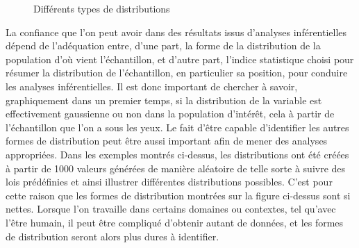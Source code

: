 \documentclass[
  letterpaper,
]{book}
\begin{document}
\begin{figure}


\caption{\label{fig-variousDistributions}Différents types de
distributions}

\end{figure}%

La confiance que l'on peut avoir dans des résultats issus d'analyses
inférentielles dépend de l'adéquation entre, d'une part, la forme de la
distribution de la population d'où vient l'échantillon, et d'autre part,
l'indice statistique choisi pour résumer la distribution de
l'échantillon, en particulier sa position, pour conduire les analyses
inférentielles. Il est donc important de chercher à savoir,
graphiquement dans un premier temps, si la distribution de la variable
est effectivement gaussienne ou non dans la population d'intérêt, cela à
partir de l'échantillon que l'on a sous les yeux. Le fait d'être capable
d'identifier les autres formes de distribution peut être aussi important
afin de mener des analyses appropriées. Dans les exemples montrés
ci-dessus, les distributions ont été créées à partir de 1000 valeurs
générées de manière aléatoire de telle sorte à suivre des lois
prédéfinies et ainsi illustrer différentes distributions possibles.
C'est pour cette raison que les formes de distribution montrées sur la
figure ci-dessus sont si nettes. Lorsque l'on travaille dans certains
domaines ou contextes, tel qu'avec l'être humain, il peut être compliqué
d'obtenir autant de données, et les formes de distribution seront alors
plus dures à identifier.
\end{document}
